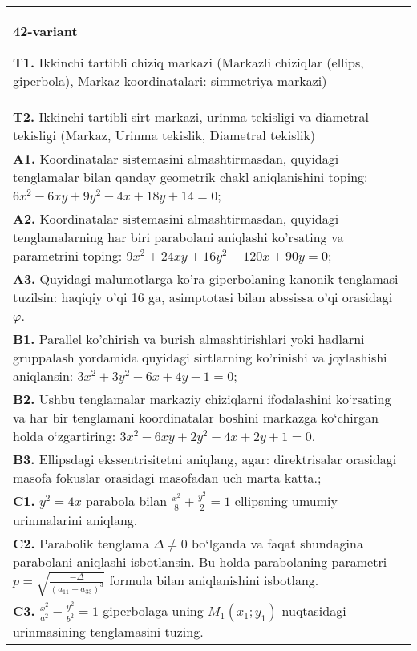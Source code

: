 \documentclass{article}
\begin{document}
\begin{tabular}{m{17cm}}
\textbf{42-variant}
\newline

\textbf{T1.} Ikkinchi tartibli chiziq markazi (Markazli chiziqlar (ellips, giperbola), Markaz koordinatalari: simmetriya markazi) \\
\textbf{T2.} Ikkinchi tartibli sirt markazi, urinma tekisligi va diametral tekisligi (Markaz, Urinma tekislik, Diametral tekislik) \\
\textbf{A1.} Koordinatalar sistemasini almashtirmasdan, quyidagi tenglamalar bilan qanday geometrik chakl aniqlanishini toping: $6 x^2-6 x y+9 y^2-4 x+18 y+14=0$; \\
\textbf{A2.} Koordinatalar sistemasini almashtirmasdan, quyidagi tenglamalarning har biri parabolani aniqlashi ko'rsating va parametrini toping: $9 x^2+24 x y+16 y^2-120 x+90 y=0$; \\
\textbf{A3.} Quyidagi malumotlarga ko'ra giperbolaning kanonik tenglamasi tuzilsin: haqiqiy o'qi 16 ga, asimptotasi bilan abssissa o'qi orasidagi $\varphi$. \\
\textbf{B1.} Parallel ko'chirish va burish almashtirishlari yoki hadlarni gruppalash yordamida quyidagi sirtlarning ko'rinishi va joylashishi aniqlansin: $3 x^2+3 y^2-6 x+4 y-1=0$; \\
\textbf{B2.} Ushbu tenglamalar markaziy chiziqlarni ifodalashini ko‘rsating va har bir tenglamani koordinatalar boshini markazga ko‘chirgan holda o‘zgartiring: $3x^2-6xy+2y^2-4x+2y+1=0$. \\
\textbf{B3.} Ellipsdagi ekssentrisitetni aniqlang, agar: direktrisalar orasidagi masofa fokuslar orasidagi masofadan uch marta katta.; \\
\textbf{C1.} $y^2=4 x$ parabola bilan $\frac{x^2}{8}+\frac{y^2}{2}=1$ ellipsning umumiy urinmalarini aniqlang. \\
\textbf{C2.} Parabolik tenglama $\Delta \neq 0$ bo‘lganda va faqat shundagina parabolani aniqlashi isbotlansin. Bu holda parabolaning parametri $p=\sqrt{\frac{-\Delta}{ (a_{11}+a_{33}) ^3}}$ formula bilan aniqlanishini isbotlang. \\
\textbf{C3.} $\frac{x^2}{a^2}-\frac{y^2}{b^2}=1$ giperbolaga uning $M_1\left(x_1; y_1\right) $ nuqtasidagi urinmasining tenglamasini tuzing. \\

\end{tabular}
\vspace{1cm}
\end{document}
